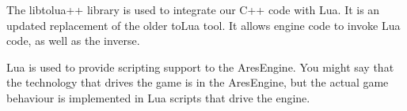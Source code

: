 

\startitemize[4]

The libtolua++ library is used to integrate our C++ code with Lua. It is an updated replacement of the older toLua tool. It allows engine code to invoke Lua code, as well as the inverse.


Lua is used to provide scripting support to the AresEngine. You might say that the technology that drives the game is in the AresEngine, but the actual game behaviour is implemented in Lua scripts that drive the engine.
\stopitemize


